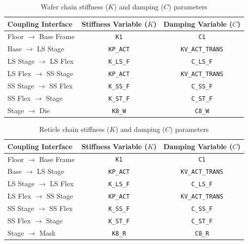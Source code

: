 \begin{table}[htbp]
\centering
\caption{Wafer chain stiffness ($K$) and damping ($C$) parameters}
\label{tab:param_matrix_wafer}
\begin{tabular}{lcc}
\toprule
Coupling Interface & Stiffness Variable ($K$) & Damping Variable ($C$) \\
\midrule
Floor $\rightarrow$ Base Frame   & \texttt{K1}       & \texttt{C1} \\
Base $\rightarrow$ LS Stage      & \texttt{KP\_ACT}  & \texttt{KV\_ACT\_TRANS} \\
LS Stage $\rightarrow$ LS Flex   & \texttt{K\_LS\_F} & \texttt{C\_LS\_F} \\
LS Flex $\rightarrow$ SS Stage   & \texttt{KP\_ACT}  & \texttt{KV\_ACT\_TRANS} \\
SS Stage $\rightarrow$ SS Flex   & \texttt{K\_SS\_F} & \texttt{C\_SS\_F} \\
SS Flex $\rightarrow$ Stage      & \texttt{K\_ST\_F} & \texttt{C\_ST\_F} \\
Stage $\rightarrow$ Die          & \texttt{K8\_W}    & \texttt{C8\_W} \\
\bottomrule
\end{tabular}
\end{table}

\begin{table}[htbp]
\centering
\caption{Reticle chain stiffness ($K$) and damping ($C$) parameters}
\label{tab:param_matrix_reticle}
\begin{tabular}{lcc}
\toprule
Coupling Interface & Stiffness Variable ($K$) & Damping Variable ($C$) \\
\midrule
Floor $\rightarrow$ Base Frame   & \texttt{K1}       & \texttt{C1} \\
Base $\rightarrow$ LS Stage      & \texttt{KP\_ACT}  & \texttt{KV\_ACT\_TRANS} \\
LS Stage $\rightarrow$ LS Flex   & \texttt{K\_LS\_F} & \texttt{C\_LS\_F} \\
LS Flex $\rightarrow$ SS Stage   & \texttt{KP\_ACT}  & \texttt{KV\_ACT\_TRANS} \\
SS Stage $\rightarrow$ SS Flex   & \texttt{K\_SS\_F} & \texttt{C\_SS\_F} \\
SS Flex $\rightarrow$ Stage      & \texttt{K\_ST\_F} & \texttt{C\_ST\_F} \\
Stage $\rightarrow$ Mask         & \texttt{K8\_R}    & \texttt{C8\_R} \\
\bottomrule
\end{tabular}
\end{table}

